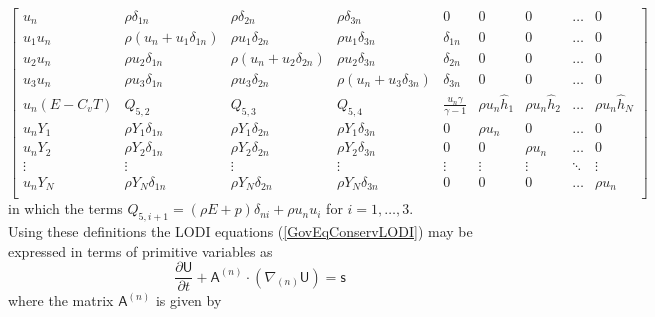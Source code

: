 \documentclass[dvips]{article}
\begin{document}
\begin{equation}
\left[
\begin{array}{ccccccccc}
u_{n} & \rho\delta_{1n} & \rho\delta_{2n} & \rho\delta_{3n} & 0 & 0 & 0 &
\ldots & 0 \\
u_{1}u_{n} & \rho (u_{n}+u_{1}\delta_{1n}) & \rho u_{1}\delta_{2n} &
\rho u_{1}\delta_{3n} & \delta_{1n} & 0 & 0 & \ldots & 0 \\
u_{2}u_{n} & \rho u_{2}\delta_{1n} & \rho (u_{n} + u_{2}\delta_{2n}) &
\rho u_{2}\delta_{3n} & \delta_{2n} & 0 & 0 & \ldots & 0 \\
u_{3}u_{n} & \rho u_{3}\delta_{1n} & \rho u_{3}\delta_{2n} &
\rho (u_{n} + u_{3}\delta_{3n}) & \delta_{3n} & 0 & 0 & \ldots & 0 \\
u_{n}(E-C_{v}T) & Q_{5,2} & Q_{5,3} & Q_{5,4} & \frac{u_{n}\gamma}{\gamma -1} &
\rho u_{n} \hat{h}_{1} & \rho u_{n} \hat{h}_{2} & \ldots &
\rho u_{n} \hat{h}_{N} \\
u_{n}Y_{1} &
\rho Y_{1}\delta_{1n} & \rho Y_{1}\delta_{2n} & \rho Y_{1}\delta_{3n} & 0 &
\rho u_{n} & 0 & \ldots & 0 \\
u_{n}Y_{2} &
\rho Y_{2}\delta_{1n} & \rho Y_{2}\delta_{2n} & \rho Y_{2}\delta_{3n} & 0 &
0 & \rho u_{n} & \ldots & 0 \\
\vdots & \vdots & \vdots & \vdots & \vdots & \vdots & \vdots & \ddots &
\vdots \\
u_{n}Y_{N} &
\rho Y_{N}\delta_{1n} & \rho Y_{N}\delta_{2n} & \rho Y_{N}\delta_{3n} & 0 &
0 & 0 & \ldots & \rho u_{n} \\
\end{array}
\right]
\end{equation}
in which the terms $Q_{5,i+1} = (\rho E + p)\delta_{ni} + \rho u_{n}u_{i}$ for
$i=1,\ldots,3$.\\[2mm]
Using these definitions the LODI equations (\ref{GovEqConservLODI})
may be expressed in terms of primitive variables as
\begin{equation}
\frac{\partial {\mathsf U}}{\partial t}
+ {\mathsf A}^{(n)}\cdot\left(\nabla_{(n)}{\mathsf U}\right)
= {\mathsf s}
\label{GovEqPrim}
\end{equation}
where the matrix ${\mathsf A}^{(n)}$ is given by
\end{document}

